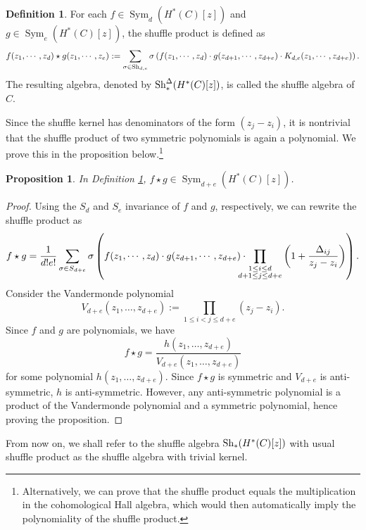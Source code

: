 \documentclass[10pt]{amsart}
\newcommand{\+}{{}^+}
\newcommand{\Sh}{\textnormal{Sh}}
\DeclareMathOperator{\Sym}{Sym}
\newtheorem {proposition}[theorem]{Proposition}
\theoremstyle{definition}
\theoremstyle {definition}
\theoremstyle {definition}
\newtheorem{definition}[theorem]{Definition}
\begin{document}
\begin{definition} \label{defnofshuffleproduct}
For each $f \in \Sym_{d}(H^{*}(C)[z])$ and $g \in \Sym_{e}(H^{*}(C)[z])$, the shuffle product is defined as 
\[ f(z_1,\cdots,z_d) \star g(z_1,\cdots,z_e) := \sum_{\sigma \in \Sh_{d,e}} \sigma \left( f(z_1,\cdots,z_d)\cdot g(z_{d+1},\cdots,z_{d+e})\cdot K_{d,e}(z_1,\cdots,z_{d+e})\right).\] 
The resulting algebra, denoted by $\Sh_*^{\Delta}(H^{*}(C)[z])$, is called the shuffle algebra of $C$. 

\end{definition}
Since the shuffle kernel has denominators of the form $(z_j-z_i)$, it is nontrivial that the shuffle product of two symmetric polynomials is again a polynomial. We prove this in the proposition below.\footnote{Alternatively, we can prove that the shuffle product equals the multiplication in the cohomological Hall algebra, which would then automatically imply the polynomiality of the shuffle product. } 


\begin{proposition}\label{prop: no pole}
    In Definition \ref{defnofshuffleproduct}, $f\star g\in \Sym_{d+e}(H^*(C)[z])$. 
\end{proposition}
\begin{proof}


    Using the $S_d$ and $S_e$ invariance of $f$ and $g$, respectively, we can rewrite the shuffle product as \begin{equation} \label{shufflesymmetrization}
        f \star g = \frac{1}{d!e!}\sum_{\sigma\in S_{d+e}} \sigma\left(  f(z_1,\cdots,z_d)\cdot g(z_{d+1},\cdots,z_{d+e})\cdot\hspace{-10pt}\prod_{\substack{1 \leq i \leq d \\ d+1 \leq j \leq d+e}}\left(1+\frac{\Delta_{ij}}{z_j-z_i}\right)\right). 
    \end{equation} 
    Consider the Vandermonde polynomial
    $$V_{d+e}(z_1,\dots,z_{d+e}):=\prod_{1\leq i<j\leq d+e}(z_j-z_i).
    $$
    Since $f$ and $g$ are polynomials, we have 
    $$f\star g=\frac{h(z_1,\dots,z_{d+e})}{V_{d+e}(z_1,\dots,z_{d+e})}
    $$
    for some polynomial $h(z_1,\dots,z_{d+e})$. Since $f\star g$ is symmetric and $V_{d+e}$ is anti-symmetric, $h$ is anti-symmetric. However, any anti-symmetric polynomial is a product of the Vandermonde polynomial and a symmetric polynomial, hence proving the proposition. 
\end{proof}

From now on, we shall refer to the shuffle algebra $\Sh_{*}(H^*(C)[z])$ with usual shuffle product as the shuffle algebra with trivial kernel.
\end{document}
